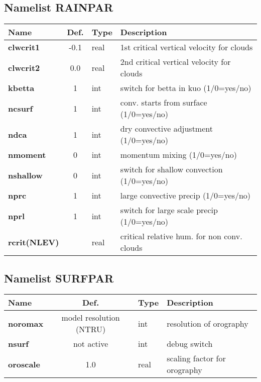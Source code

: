 \subsection{Namelist RAINPAR}
\begin{tabular}{|l|c|l|l|}                                  
\hline                                                        
Name   & Def. & Type & Description \\               
\hline                                                        
{\bf clwcrit1   } & -0.1 & real & 1st critical vertical velocity for clouds \\
{\bf clwcrit2   } &  0.0 & real & 2nd critical vertical velocity for clouds \\
{\bf kbetta     } &  1   & int  & switch for betta in kuo (1/0=yes/no) \\
{\bf ncsurf     } &  1   & int  & conv. starts from surface (1/0=yes/no) \\
{\bf ndca       } &  1   & int  & dry convective adjustment (1/0=yes/no) \\
{\bf nmoment    } &  0   & int  & momentum mixing (1/0=yes/no) \\
{\bf nshallow   } &  0   & int  & switch for shallow convection (1/0=yes/no) \\
{\bf nprc       } &  1   & int  & large convective precip (1/0=yes/no) \\
{\bf nprl       } &  1   & int  & switch for large scale precip (1/0=yes/no) \\
{\bf rcrit(NLEV)} &      & real & critical relative hum. for non conv. clouds \\
\hline                                                        
\end{tabular}

  
\subsection{Namelist SURFPAR}
\begin{tabular}{|l|c|l|l|}                                  
\hline                                                        
Name   & Def. & Type & Description \\               
\hline                                                        
{\bf noromax  }& model resolution (NTRU) & int & resolution of orography \\
{\bf nsurf  }& not active & int & debug switch \\  
{\bf oroscale  }& 1.0 & real & scaling factor for orography \\
\hline                                                        
\end{tabular}


